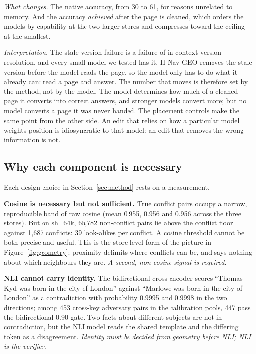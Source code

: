 \documentclass[journal=jcisd8,manuscript=article]{achemso}
\begin{document}
\emph{What changes.} The native accuracy, from 30 to 61, for reasons unrelated to memory. And the accuracy \emph{achieved} after the page is cleaned, which orders the models by capability at the two larger stores and compresses toward the ceiling at the smallest.

\emph{Interpretation.} The stale-version failure is a failure of in-context version resolution, and every small model we tested has it. H-Nav-GEO removes the stale version before the model reads the page, so the model only has to do what it already can: read a page and answer. The number that moves is therefore set by the method, not by the model. The model determines how much of a cleaned page it converts into correct answers, and stronger models convert more; but no model converts a page it was never handed. The placement controls make the same point from the other side. An edit that relies on how a particular model weights position is idiosyncratic to that model; an edit that removes the wrong information is not.

\subsection{Why each component is necessary}
\label{sec:components}

Each design choice in Section~\ref{sec:method} rests on a measurement.

\textbf{Cosine is necessary but not sufficient.} True conflict pairs occupy a narrow, reproducible band of raw cosine (mean 0.955, 0.956 and 0.956 across the three stores). But on sh\_64k, 65,782 non-conflict pairs lie above the conflict floor against 1,687 conflicts: 39 look-alikes per conflict. A cosine threshold cannot be both precise and useful. This is the store-level form of the picture in Figure~\ref{fig:geometry}: proximity delimits where conflicts can be, and says nothing about which neighbours they are. \emph{A second, non-cosine signal is required.}

\textbf{NLI cannot carry identity.} The bidirectional cross-encoder scores ``Thomas Kyd was born in the city of London'' against ``Marlowe was born in the city of London'' as a contradiction with probability 0.9995 and 0.9998 in the two directions; among 453 cross-key adversary pairs in the calibration pools, 447 pass the bidirectional 0.90 gate. Two facts about different subjects are not in contradiction, but the NLI model reads the shared template and the differing token as a disagreement. \emph{Identity must be decided from geometry before NLI; NLI is the verifier.}
\end{document}
